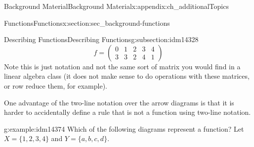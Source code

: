 \documentclass[oneside,10pt,]{book}
\numberwithin{equation}{chapter}
\newcommand{\twoline}[2]{\begin{pmatrix}#1 \\ #2 \end{pmatrix}}
\newcommand{\amp}{&}
\begin{document}
\begin{appendixptx}{Background Material}{}{Background Material}{}{}{x:appendix:ch_additionalTopics}
\begin{sectionptx}{Functions}{}{Functions}{}{}{x:section:sec_background-functions}
\begin{subsectionptx}{Describing Functions}{}{Describing Functions}{}{}{g:subsection:idm14328}
\begin{equation*}
f = \twoline{0 \amp 1 \amp 2\amp 3 \amp 4}{3 \amp 3 \amp 2 \amp 4 \amp 1}
\end{equation*}
Note this is just notation and not the same sort of matrix you would find in a linear algebra class (it does not make sense to do operations with these matrices, or row reduce them, for example).%
\par
One advantage of the two-line notation over the arrow diagrams is that it is harder to accidentally define a rule that is not a function using two-line notation.%
\begin{example}{}{g:example:idm14374}%
Which of the following diagrams represent a function? Let \(X = \{1,2,3,4\}\) and \(Y = \{a,b,c,d\}\).%
\begin{sidebyside}{3}{0.0416666666666667}{0.0416666666666667}{0.0833333333333333}%
\begin{sbspanel}{0.25}%
%
\end{sbspanel}%
\begin{sbspanel}{0.25}%
%
\end{sbspanel}%
\begin{sbspanel}{0.25}%
\end{sbspanel}
\end{sidebyside}
\end{example}
\end{subsectionptx}
\end{sectionptx}
\end{appendixptx}
\end{document}
